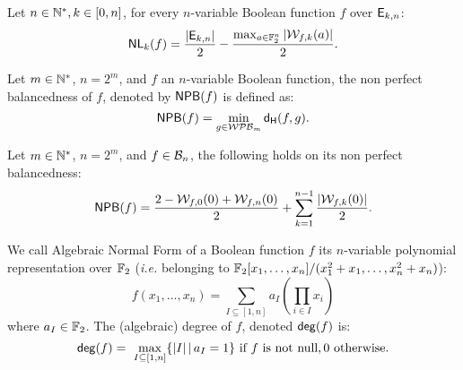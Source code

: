 \documentclass{llncs}
\begin{document}
\ifnum{}
\else
\begin{Prop}\label{prop:nlk}
	Let $n\in \mathbb{N}^*, k\in [0,n]$, for every $n$-variable Boolean function $f$ over $\mathsf{E}_{k,n}$:
	\[ \mathsf{NL}_{k}(f)=\frac{|\mathsf{E}_{k,n}|}{2} -\frac{\max_{a\in \mathbb{F}_2^n} |\mathcal{W}_{f,k}(a)|}{2}  .\]
\end{Prop}


\begin{definition}
	Let $m\in\mathbb{N}^*$, $n=2^m$, and $f$ an $n$-variable Boolean function, the non perfect balancedness of $f$, denoted by $\mathsf{NPB}(f)$ is defined as:
	\[\mathsf{NPB}(f)=\min_{g \in \mathcal{WPB}_{m}} \mathsf{d_H}(f,g).\]
\end{definition}

\begin{Prop}\label{prop:NPBrestWalsh}
	Let $m\in\mathbb{N}^*$, $n=2^m$, and $f\in \mathcal{B}_{n}$, the following holds on its non perfect balancedness:
	\[\displaystyle \mathsf{NPB}(f)= \frac{2-\mathcal{W}_{f,0}(0)+ \mathcal{W}_{f,n}(0)}{2} + \sum_{k=1}^{n-1}\frac{ |\mathcal{W}_{f,k}(0)|}{2} .\]
\end{Prop}
\fi


\ifnum{}
\begin{definition}\label{def:anf}
We call Algebraic Normal Form of a Boolean function $f$ its $n$-variable polynomial representation over $\mathbb{F}_2$ (\textit{i.e.} belonging to $\mathbb{F}_2[x_1,\dots,x_n]/(x_1^2+x_1,\dots,x_n^2+x_n)$):
\ifnum{}
\vspace{-0.3cm}
\else
\fi
	\[f(x_1,\dots,x_n)= \sum_{I \subseteq [1,n]} a_I \left( \prod_{i \in I} x_i \right) \]%
	where $a_I\in \mathbb{F}_2$. 
The (algebraic) degree of $f$, denoted $\mathsf{deg}(f)$ is:
\ifnum{}
\vspace{-0.3cm}
\else
\fi
 \[\mathsf{deg}(f)=\
\max_{I\subseteq [1,n]}\{ |I|\, | \, a_I=1\}  \text{ if $f$ is not null},0  \text{ otherwise}.\]
\end{definition}	
\fi

\end{document}
